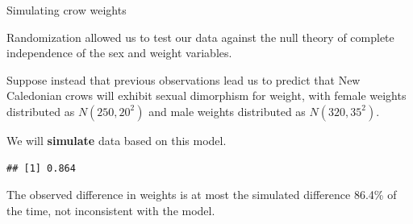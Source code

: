 \documentclass[
  ignorenonframetext,
]{beamer}
\newenvironment{Shaded}{\begin{snugshade}}{\end{snugshade}}
\newcommand{\ControlFlowTok}[1]{\textcolor[rgb]{0.13,0.29,0.53}{\textbf{#1}}}
\newcommand{\DataTypeTok}[1]{\textcolor[rgb]{0.13,0.29,0.53}{#1}}
\newcommand{\DecValTok}[1]{\textcolor[rgb]{0.00,0.00,0.81}{#1}}
\newcommand{\KeywordTok}[1]{\textcolor[rgb]{0.13,0.29,0.53}{\textbf{#1}}}
\newcommand{\NormalTok}[1]{#1}
\newcommand{\OperatorTok}[1]{\textcolor[rgb]{0.81,0.36,0.00}{\textbf{#1}}}
\newcommand{\StringTok}[1]{\textcolor[rgb]{0.31,0.60,0.02}{#1}}
\begin{document}
\begin{frame}[fragile]{Simulating crow weights}
\protect\hypertarget{simulating-crow-weights}{}

Randomization allowed us to test our data against the null theory of
complete independence of the sex and weight variables.

Suppose instead that previous observations lead us to predict that New
Caledonian crows will exhibit sexual dimorphism for weight, with female
weights distributed as \(N(250,20^2)\) and male weights distributed as
\(N(320, 35^2)\).

We will \textbf{simulate} data based on this model.

\scriptsize

\begin{Shaded}
\end{Shaded}

\begin{verbatim}
## [1] 0.864
\end{verbatim}

\normalsize

The observed difference in weights is at most the simulated difference
86.4\% of the time, not inconsistent with the model.

\end{frame}
\end{document}
